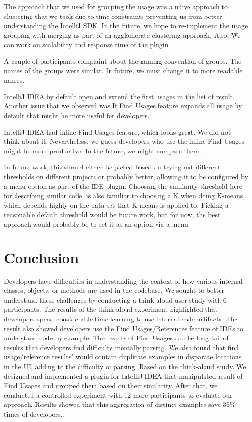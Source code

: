 \documentclass[conference]{IEEEtran}
\begin{document}
The approach that we used for grouping the usage was a naive approach to clustering that we took due to time constraints preventing us from better understanding the IntelliJ SDK. In the future, we hope to re-implement the usage grouping with merging as part of an agglomerate clustering approach. Also, We can work on scalability and response time of the plugin \par

A couple of participants complaint about the naming convention of groups. The names of the groups were similar. In future, we must change it to more readable names.\par

IntelliJ IDEA by default open and extend the first usages in the list of result. Another issue that we observed was If Find Usages feature expands all usage by default that might be more useful for developers.\par

IntelliJ IDEA had inline Find Usages feature, which looks great. We did not think about it. Nevertheless, we guess developers who use the inline Find Usages might be more productive. In the future, we might compare them. \par

In future work, this should either be picked based on trying out different thresholds on different projects or probably better, allowing it to be configured by a menu option as part of the IDE plugin. Choosing the similarity threshold here for describing similar code, is also familiar to choosing a K when doing K-means, which depends highly on the data-set that K-means is applied to. Picking a reasonable default threshold would be future work, but for now, the best approach would probably be to set it as an option via a menu.

\section{Conclusion}
Developers have difficulties in understanding the context of how various internal classes, objects, or methods are used in the codebase. We sought to better understand these challenges by conducting a think-aloud user study with 6 participants. The results of the think-aloud experiment highlighted that developers spend considerable time learning to use internal code artifacts. The result also showed developers use the Find Usages/References feature of IDEs to understand code by example. The results of Find Usages can be long tail of results that developers find difficulty mentally parsing. We also found that find usage/reference results' would contain duplicate examples in disparate locations in the UI, adding to the difficulty of parsing. Based on the think-aloud study. We designed and implemented a plugin for IntelliJ IDEA that manipulated result of Find Usages and grouped them based on their similarity. After that, we conducted a controlled experiment with 12 more participants to evaluate our approach. Results showed that this aggregation of distinct examples save 35\% times of developers..
\end{document}
